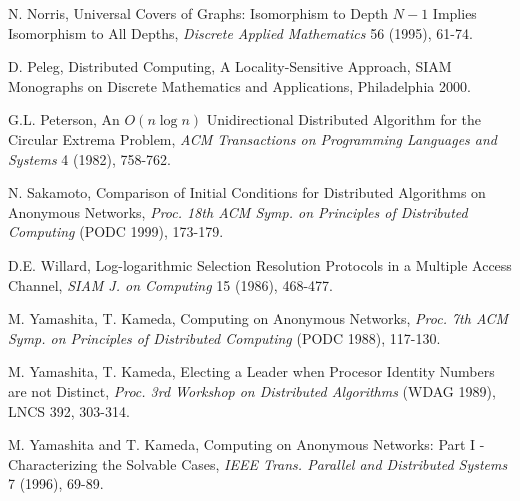 \documentclass[a4paper,10pt]{article}
\begin{document}
\begin{thebibliography}{99}
N. Norris, Universal Covers of Graphs: Isomorphism to Depth $N-1$ Implies Isomorphism to All Depths,
{\em Discrete Applied Mathematics} 56 (1995), 61-74.
               
D. Peleg,
Distributed Computing, A Locality-Sensitive Approach,
SIAM Monographs on Discrete Mathematics and Applications, Philadelphia 2000.

G.L. Peterson, An $O(n \log n)$ Unidirectional Distributed Algorithm for the Circular Extrema Problem,
{\em ACM Transactions on Programming Languages and Systems} 4 (1982), 758-762.

N. Sakamoto,
Comparison of Initial Conditions for Distributed Algorithms
on Anonymous  Networks,
{\em Proc. 18th ACM Symp. on Principles of Distributed Computing} (PODC 1999), 173-179.

D.E. Willard, 
Log-logarithmic Selection Resolution Protocols in a Multiple Access Channel,
{\em SIAM J. on Computing} 15 (1986), 468-477. 

M. Yamashita, T. Kameda,
Computing on Anonymous Networks,
{\em Proc. 7th ACM Symp. on Principles of Distributed Computing} (PODC 1988), 117-130.

M. Yamashita, T. Kameda,
Electing a Leader when Procesor Identity Numbers are not Distinct,
{\em Proc. 3rd Workshop on Distributed Algorithms} (WDAG 1989), LNCS 392, 303-314.

M. Yamashita and T. Kameda,
Computing on Anonymous Networks: Part I - Characterizing the Solvable Cases,
{\em IEEE Trans. Parallel and Distributed Systems} 7 (1996), 69-89. 

\end{thebibliography}
\end{document}
